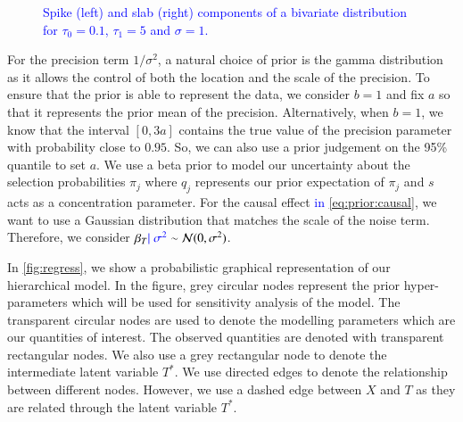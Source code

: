 \documentclass[preprint,12pt]{elsarticle}
\newcommand{\normal}{\mathcal{N}}
\newcommand{\added}[1]{\textcolor{blue}{#1}}
\begin{document}
\begin{figure}
	\begin{center}
\qquad
{}
	\end{center}
	\caption{\added{Spike (left) and slab (right) components of a bivariate distribution for $\tau_0 = 0.1$, $\tau_1 = 5$ and $\sigma=1$.}}
	\label{fig:ssbl}
\end{figure}

For the precision term $1/\sigma^2$, a natural choice of prior is the gamma distribution
as it allows the control of both the location and the scale of the precision.
To ensure that the prior is able to represent the data, we consider $b=1$ and 
fix $a$ so that it represents the prior mean of the precision.
Alternatively, when $b=1$, we know that the interval
$[0, 3a]$ contains the true value of the precision parameter with probability close to $0.95$.
So, we can also use a prior judgement on the 95\% quantile to set $a$.
We use a beta prior to
model our uncertainty about
the selection probabilities $\pi_j$ where  $q_j$ represents our prior expectation of $\pi_j$ and $s$ acts as 
a concentration parameter.
For the causal effect \added{in \cref{eq:prior:causal}}, we want to use a Gaussian distribution that 
matches the scale of the noise term. Therefore, we consider $\beta_T\added{\mid\sigma^2}\sim \normal(0,\sigma^2)$. 

In \cref{fig:regress}, we show a probabilistic graphical representation
of our hierarchical model. In the figure, grey circular nodes represent the
prior hyper-parameters which will be used for sensitivity analysis
of the model. The transparent circular nodes are used to denote
the modelling parameters which are our quantities of interest. 
The observed quantities are denoted with transparent rectangular
nodes. We also use a grey rectangular node to denote the intermediate
latent variable $T^*$. We use directed edges to denote the
relationship between different nodes. However, we use a dashed
edge between $X$ and $T$ as they are related through the latent
variable $T^*$. 
\end{document}
